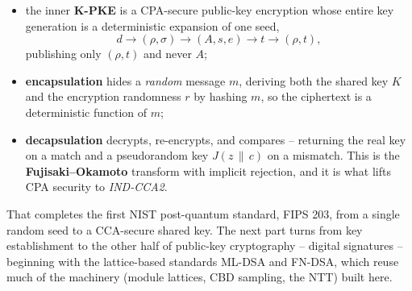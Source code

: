 \begin{itemize}
  \item the inner \textbf{K-PKE} is a CPA-secure public-key encryption whose entire key generation is a deterministic expansion of one seed,
  \[
  d \longrightarrow (\rho,\sigma) \longrightarrow (A,s,e) \longrightarrow t \longrightarrow (\rho,t),
  \]
  publishing only $(\rho,t)$ and never $A$;
  \item \textbf{encapsulation} hides a \emph{random} message $m$, deriving both the shared key $K$ and the encryption randomness $r$ by hashing $m$, so the ciphertext is a deterministic function of $m$;
  \item \textbf{decapsulation} decrypts, re-encrypts, and compares -- returning the real key on a match and a pseudorandom key $J(z\,\|\,c)$ on a mismatch. This is the \textbf{Fujisaki--Okamoto} transform with implicit rejection, and it is what lifts CPA security to \emph{IND-CCA2}.
\end{itemize}

That completes the first NIST post-quantum standard, FIPS 203, from a single random seed to a CCA-secure shared key. The next part turns from key establishment to the other half of public-key cryptography -- digital signatures -- beginning with the lattice-based standards ML-DSA and FN-DSA, which reuse much of the machinery (module lattices, CBD sampling, the NTT) built here.

\printbibliography[heading=chapterrefs]

